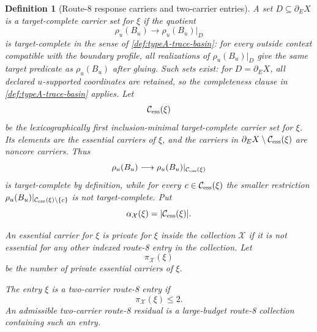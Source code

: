 \documentclass[11pt]{article}
\newtheorem{definition}[theorem]{Definition}
\begin{document}
\begin{definition}[Route-8 response carriers and two-carrier entries]
A set $D\subseteq\partial_E X$ is a \emph{target-complete carrier set for
$\xi$} if the quotient
\[
\rho_u(B_u)\longrightarrow \rho_u(B_u)|_D
\]
is target-complete in the sense of \cref{def:typeA-trace-basin}: for every
outside context compatible with the boundary profile, all realizations of
$\rho_u(B_u)|_D$ give the same target predicate as $\rho_u(B_u)$ after gluing.
Such sets exist: for $D=\partial_E X$, all declared $u$-supported coordinates
are retained, so the completeness clause in \cref{def:typeA-trace-basin}
applies.  Let
\[
\mathcal C_{\rm ess}(\xi)
\]
be the lexicographically first inclusion-minimal target-complete carrier set for
$\xi$.  Its elements are the \emph{essential carriers} of $\xi$, and the
carriers in $\partial_E X\setminus\mathcal C_{\rm ess}(\xi)$ are
\emph{noncore carriers}.  Thus
\[
\rho_u(B_u)\longrightarrow
\rho_u(B_u)|_{\mathcal C_{\rm ess}(\xi)}
\]
is target-complete by definition, while for every
$c\in\mathcal C_{\rm ess}(\xi)$ the smaller restriction
$\rho_u(B_u)|_{\mathcal C_{\rm ess}(\xi)\setminus\{c\}}$ is not
target-complete.  Put
\[
\alpha_{\mathcal X}(\xi)=|\mathcal C_{\rm ess}(\xi)|.
\]

An essential carrier for $\xi$ is \emph{private for $\xi$} inside the collection
$\mathcal X$ if it is not essential for any other indexed route-8 entry in the
collection.  Let
\[
\pi_{\mathcal X}(\xi)
\]
be the number of private essential carriers of $\xi$.

The entry $\xi$ is a \emph{two-carrier route-8 entry} if
\[
\pi_{\mathcal X}(\xi)\le2.
\]
	An admissible \emph{two-carrier route-8 residual} is a large-budget route-8
	collection containing such an entry.
	\end{definition}
\end{document}
